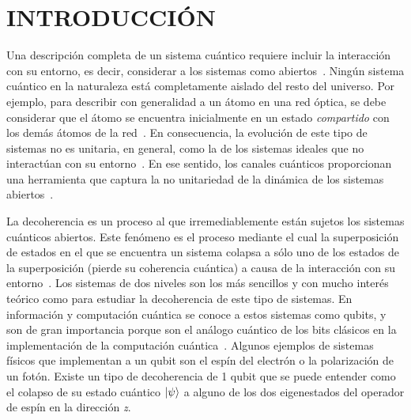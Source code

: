 \chapter{INTRODUCCIÓN}

Una descripción completa  de un sistema cuántico requiere
incluir la interacción
con su entorno, es decir, considerar a los sistemas como 
abiertos~\cite{breuer2002theory}. Ningún sistema cuántico en la
naturaleza está completamente aislado del resto del universo.  
Por ejemplo, para describir con generalidad a un átomo en una red óptica, se debe
considerar que el átomo se encuentra inicialmente en un estado \textit{compartido} 
con los demás átomos de la red~\cite{pepino2011open}. En consecuencia,
la evolución de este tipo de sistemas no es unitaria, en general, como 
la de los sistemas ideales que no interactúan con su entorno~\cite{preskill1998lecture}. 
En ese sentido, los canales cuánticos proporcionan una herramienta que captura 
la no unitariedad de la dinámica de los sistemas abiertos~\cite{nielsen_chuang_2011}.


La decoherencia es un proceso al que irremediablemente están sujetos los 
sistemas cuánticos abiertos. 
Este fenómeno es el proceso mediante 
el cual la superposición de estados en el que se encuentra un sistema colapsa a 
sólo uno de los estados de la superposición (pierde su coherencia cuántica)
a causa de la interacción con su entorno~\cite{breuer2002theory}. 
Los sistemas de dos niveles son 
los más sencillos y con mucho interés teórico como para estudiar 
la decoherencia de este tipo de sistemas. 
En información y computación 
cuántica se conoce a estos sistemas como qubits, y son de gran importancia 
porque son el análogo cuántico de los bits clásicos en 
la implementación de la computación cuántica~\cite{nielsen_chuang_2011}. 
Algunos ejemplos de sistemas físicos que implementan a un qubit son el espín
del electrón o la polarización de un fotón. 
Existe un tipo de decoherencia de 1 qubit que se puede entender como 
el colapso de su estado cuántico $\ket{\psi}$ a alguno de los dos eigenestados
del operador de espín en la dirección \textit{z}.


